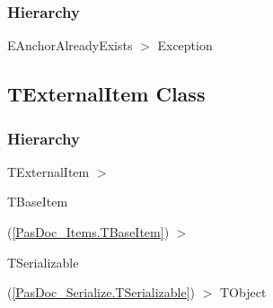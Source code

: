 \documentclass{report}
\newif\ifpdf
\begin{document}
\subsubsection*{\large{\textbf{Hierarchy}}\normalsize\hspace{1ex}\hfill}
EAnchorAlreadyExists {$>$} Exception
\ifpdf
\subsection*{\large{\textbf{TExternalItem Class}}\normalsize\hspace{1ex}\hrulefill}
\else
\subsection*{TExternalItem Class}
\fi
\label{PasDoc_Items.TExternalItem}
\subsubsection*{\large{\textbf{Hierarchy}}\normalsize\hspace{1ex}\hfill}
TExternalItem {$>$} \begin{ttfamily}TBaseItem\end{ttfamily}(\ref{PasDoc_Items.TBaseItem}) {$>$} \begin{ttfamily}TSerializable\end{ttfamily}(\ref{PasDoc_Serialize.TSerializable}) {$>$} 
TObject
\end{document}
